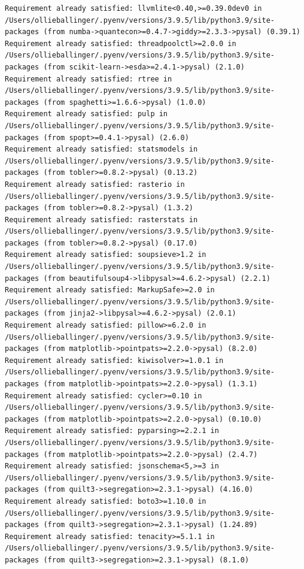 \documentclass[
  letterpaper,
  DIV=11,
  numbers=noendperiod]{scrreprt}
\begin{document}
\begin{verbatim}
Requirement already satisfied: llvmlite<0.40,>=0.39.0dev0 in /Users/ollieballinger/.pyenv/versions/3.9.5/lib/python3.9/site-packages (from numba->quantecon>=0.4.7->giddy>=2.3.3->pysal) (0.39.1)
Requirement already satisfied: threadpoolctl>=2.0.0 in /Users/ollieballinger/.pyenv/versions/3.9.5/lib/python3.9/site-packages (from scikit-learn->esda>=2.4.1->pysal) (2.1.0)
Requirement already satisfied: rtree in /Users/ollieballinger/.pyenv/versions/3.9.5/lib/python3.9/site-packages (from spaghetti>=1.6.6->pysal) (1.0.0)
Requirement already satisfied: pulp in /Users/ollieballinger/.pyenv/versions/3.9.5/lib/python3.9/site-packages (from spopt>=0.4.1->pysal) (2.6.0)
Requirement already satisfied: statsmodels in /Users/ollieballinger/.pyenv/versions/3.9.5/lib/python3.9/site-packages (from tobler>=0.8.2->pysal) (0.13.2)
Requirement already satisfied: rasterio in /Users/ollieballinger/.pyenv/versions/3.9.5/lib/python3.9/site-packages (from tobler>=0.8.2->pysal) (1.3.2)
Requirement already satisfied: rasterstats in /Users/ollieballinger/.pyenv/versions/3.9.5/lib/python3.9/site-packages (from tobler>=0.8.2->pysal) (0.17.0)
Requirement already satisfied: soupsieve>1.2 in /Users/ollieballinger/.pyenv/versions/3.9.5/lib/python3.9/site-packages (from beautifulsoup4->libpysal>=4.6.2->pysal) (2.2.1)
Requirement already satisfied: MarkupSafe>=2.0 in /Users/ollieballinger/.pyenv/versions/3.9.5/lib/python3.9/site-packages (from jinja2->libpysal>=4.6.2->pysal) (2.0.1)
Requirement already satisfied: pillow>=6.2.0 in /Users/ollieballinger/.pyenv/versions/3.9.5/lib/python3.9/site-packages (from matplotlib->pointpats>=2.2.0->pysal) (8.2.0)
Requirement already satisfied: kiwisolver>=1.0.1 in /Users/ollieballinger/.pyenv/versions/3.9.5/lib/python3.9/site-packages (from matplotlib->pointpats>=2.2.0->pysal) (1.3.1)
Requirement already satisfied: cycler>=0.10 in /Users/ollieballinger/.pyenv/versions/3.9.5/lib/python3.9/site-packages (from matplotlib->pointpats>=2.2.0->pysal) (0.10.0)
Requirement already satisfied: pyparsing>=2.2.1 in /Users/ollieballinger/.pyenv/versions/3.9.5/lib/python3.9/site-packages (from matplotlib->pointpats>=2.2.0->pysal) (2.4.7)
Requirement already satisfied: jsonschema<5,>=3 in /Users/ollieballinger/.pyenv/versions/3.9.5/lib/python3.9/site-packages (from quilt3->segregation>=2.3.1->pysal) (4.16.0)
Requirement already satisfied: boto3>=1.10.0 in /Users/ollieballinger/.pyenv/versions/3.9.5/lib/python3.9/site-packages (from quilt3->segregation>=2.3.1->pysal) (1.24.89)
Requirement already satisfied: tenacity>=5.1.1 in /Users/ollieballinger/.pyenv/versions/3.9.5/lib/python3.9/site-packages (from quilt3->segregation>=2.3.1->pysal) (8.1.0)

\end{verbatim}
\end{document}
